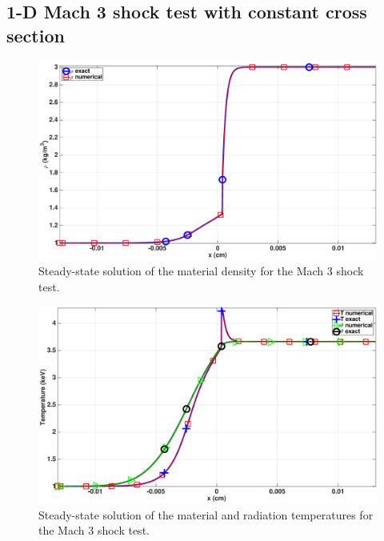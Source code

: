\documentclass[review]{elsarticle}
\begin{document}
\subsection{1-D Mach 3 shock test with constant cross section}
%
\begin{figure}[H]
    \centering
    \includegraphics[width=\textwidth]{figures/cst-xs/mach_3_cst_xs_nel_1000_density.eps}
    \caption{Steady-state solution of the material density for the Mach 3 shock test.}\label{fig:mach-3-cst-xs-dens}
\end{figure}
%
\begin{figure}[H]
    \centering
    \includegraphics[width=\textwidth]{figures/cst-xs/mach_3_cst_xs_nel_1000_temperature.eps}
    \caption{Steady-state solution of the material and radiation temperatures for the Mach 3 shock test.}\label{fig:mach-3-cst-xs-temp}
\end{figure}
%
\end{document}
